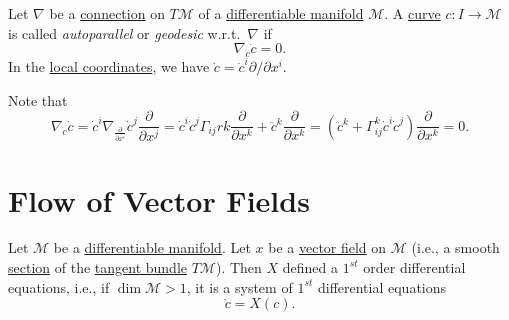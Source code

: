 \begin{definition}[Autoparallel]\label{def:autoparallel}
	Let \(\nabla \) be a \hyperref[def:linear-connection]{connection} on \(T \mathcal{M} \) of a \hyperref[def:smooth-manifold]{differentiable manifold} \(\mathcal{M} \). A \hyperref[def:curve]{curve} \(c\colon I \to \mathcal{M} \) is called \emph{autoparallel} or \emph{geodesic} w.r.t.\ \(\nabla \) if
	\[
		\nabla _{\dot{c}}\dot{c} = 0.
	\]
	In the \hyperref[def:coordinate-chart]{local coordinates}, we have \(\dot{c} = \dot{c}^i \partial / \partial x^i\).
\end{definition}

Note that
\[
	\nabla _{\dot{c}}\dot{c}
	= \dot{c}^i \nabla _{\frac{\partial }{\partial x^i} } \dot{c}^j \frac{\partial }{\partial x^j}
	= \dot{c}^i \dot{c}^j \Gamma _{ij}rk \frac{\partial }{\partial x^k} + \ddot{c}^k \frac{\partial }{\partial x^k}
	= \left( \ddot{c}^k + \Gamma _{ij}^k \dot{c}^i \dot{c}^j \right) \frac{\partial }{\partial x^k}
	= 0.
\]

\section{Flow of Vector Fields}
Let \(\mathcal{M} \) be a \hyperref[def:smooth-manifold]{differentiable manifold}. Let \(x\) be a \hyperref[def:vector-field]{vector field} on \(\mathcal{M} \) (i.e., a smooth \hyperref[def:section]{section} of the \hyperref[def:tangent-bundle]{tangent bundle} \(T\mathcal{M} \)). Then \(X\) defined a \(1^{st}\) order differential equations, i.e., if \(\dim \mathcal{M} > 1\), it is a system of \(1^{st} \) differential equations
\[
	\dot{c} = X(c).
\]

